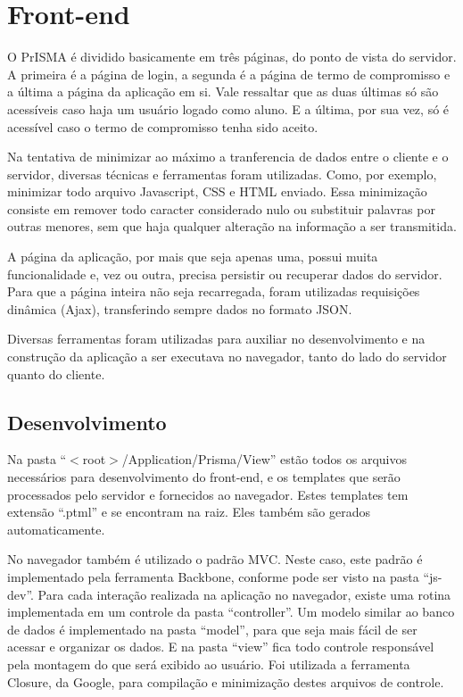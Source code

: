 \documentclass[graduacao,brazil]{ThesisPUC}
\begin{document}
\section{Front-end}

O PrISMA é dividido basicamente em três páginas, do ponto de vista do servidor. A primeira é a página de login, a segunda é a página de termo de compromisso e a última a página da aplicação em si. Vale ressaltar que as duas últimas só são acessíveis caso haja um usuário logado como aluno. E a última, por sua vez, só é acessível caso o termo de compromisso tenha sido aceito.

Na tentativa de minimizar ao máximo a tranferencia de dados entre o cliente e o servidor, diversas técnicas e ferramentas foram utilizadas. Como, por exemplo, minimizar todo arquivo Javascript, CSS e HTML enviado. Essa minimização consiste em remover todo caracter considerado nulo ou substituir palavras por outras menores, sem que haja qualquer alteração na informação a ser transmitida.

A página da aplicação, por mais que seja apenas uma, possui muita funcionalidade e, vez ou outra, precisa persistir ou recuperar dados do servidor. Para que a página inteira não seja recarregada, foram utilizadas requisições dinâmica (Ajax), transferindo sempre dados no formato JSON.

Diversas ferramentas foram utilizadas para auxiliar no desenvolvimento e na construção da aplicação a ser executava no navegador, tanto do lado do servidor quanto do cliente.

\subsection{Desenvolvimento}

Na pasta “$<$root$>$/Application/Prisma/View” estão todos os arquivos necessários para desenvolvimento do front-end, e os templates que serão processados pelo servidor e fornecidos ao navegador. Estes templates tem extensão “.ptml” e se encontram na raiz. Eles também são gerados automaticamente.

No navegador também é utilizado o padrão MVC. Neste caso, este padrão é implementado pela ferramenta Backbone, conforme pode ser visto na pasta “js-dev”. Para cada interação realizada na aplicação no navegador, existe uma rotina implementada em um controle da pasta “controller”. Um modelo similar ao banco de dados é implementado na pasta “model”, para que seja mais fácil de ser acessar e organizar os dados. E na pasta “view” fica todo controle responsável pela montagem do que será exibido ao usuário. Foi utilizada a ferramenta Closure, da Google, para compilação e minimização destes arquivos de controle.
\end{document}
